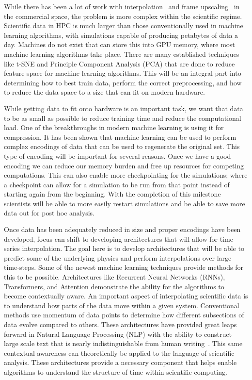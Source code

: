 \documentclass[12pt]{article}
\begin{document}
\noindent
While there has been a lot of work with interpolation~\cite{} and frame
upscaling~\cite{} in the commercial space, the problem is more complex within
the scientific regime. Scientific data in HPC is much larger than those
conventionally used in machine learning algorithms, with simulations capable of
producing petabytes of data a day.  Machines do not exist that can store this
into GPU memory, where most machine learning algorithms take place. There are
many established techniques like t-SNE and Principle Component Analysis (PCA)
that are done to reduce feature space for machine learning algorithms. This will
be an integral part into determining how to best train data, perform the correct
preprocessing, and how to reduce the data space to a size that can fit on modern
hardware.

\noindent
While getting data to fit onto hardware is an important task, we want that data
to be as small as possible to reduce training time and reduce the computational
load. One of the breakthroughs in modern machine learning is using it for
compression. It has been shown that machine learning can be used to perform
complex encodings of data that can be used to regenerate the original set. This
type of encoding will be important for several reasons. Once we have a good
encoding we can reduce our memory burden and free up resources for competing
computations. This can also enable more checkpointing for the simulations; where
a checkpoint can allow for a simulation to be run from that point instead of
starting again from the beginning. With the completion of this milestone
scientists will be able to more easily restart simulations and be able to save
more data out for post hoc analysis.

\noindent
Once data has been adequately reduced in size and proper encodings have been
developed, focus can shift to developing architectures that will allow for time
series interpolation. The goal here is to develop architectures that will be
able to predict some of the underlying physics and perform interpolations over
large time-steps. Some of the newest machine learning techniques provide methods
for this to be possible. Architectures like Recurrent Neural Networks (RNNs),
Transformers, and Attention demonstrate the ability for the algorithms to
become contextually aware. An important aspect of interpolating scientific
data is to understand how parts of the data move within a given system.
Conventional methods use momentum of data points to determine how different
subsections of data evolve compared to others. These architectures have provided
great leaps forward in Natural Language Processing (NLP) with the ability to
construct large scale text that is nearly indistinguishable from human
writing~\cite{}. This same contextual awareness can theoretically be applied to
the language of scientific analysis. These architectures provide a necessary
component that helps enable algorithms to understand the structure of time
within scientific computing. 
\end{document}
